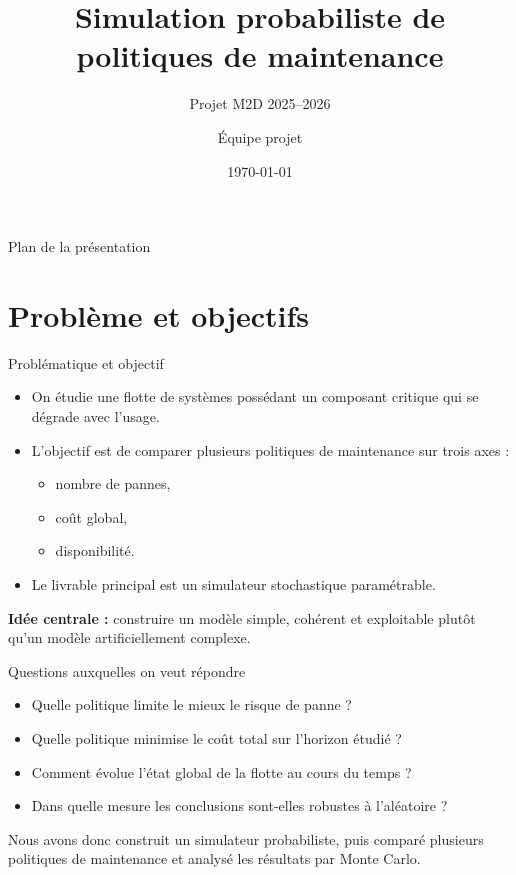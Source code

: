 \documentclass[aspectratio=169]{beamer}
\title{Simulation probabiliste de politiques de maintenance}
\subtitle{Projet M2D 2025--2026}
\author{Équipe projet}
\date{\today}
\begin{document}
\begin{frame}
  \titlepage
\end{frame}

\begin{frame}{Plan de la présentation}
\tableofcontents
\end{frame}

\section{Problème et objectifs}

\begin{frame}{Problématique et objectif}
\begin{itemize}
  \item On étudie une flotte de systèmes possédant un composant critique qui se dégrade avec l'usage.
  \item L'objectif est de comparer plusieurs politiques de maintenance sur trois axes :
  \begin{itemize}
    \item nombre de pannes,
    \item coût global,
    \item disponibilité.
  \end{itemize}
  \item Le livrable principal est un simulateur stochastique paramétrable.
\end{itemize}

\vspace{0.3cm}
\textbf{Idée centrale :} construire un modèle simple, cohérent et exploitable plutôt qu'un modèle artificiellement complexe.
\end{frame}

\begin{frame}{Questions auxquelles on veut répondre}
\begin{itemize}
  \item Quelle politique limite le mieux le risque de panne ?
  \item Quelle politique minimise le coût total sur l'horizon étudié ?
  \item Comment évolue l'état global de la flotte au cours du temps ?
  \item Dans quelle mesure les conclusions sont-elles robustes à l'aléatoire ?
\end{itemize}

\vspace{0.25cm}
Nous avons donc construit un simulateur probabiliste, puis comparé plusieurs politiques de maintenance et analysé les résultats par Monte Carlo.
\end{frame}
\end{document}
